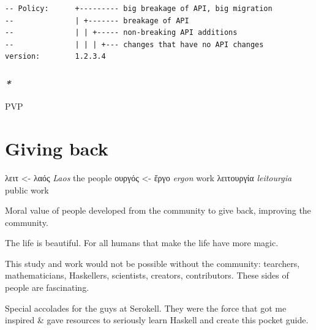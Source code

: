 \documentclass[a4paper,14pt,oneside]{book}
\begin{document}
\begin{center}

\end{center}

\begin{verbatim}
-- Policy:      +--------- big breakage of API, big migration
--              | +------- breakage of API
--              | | +----- non-breaking API additions
--              | | | +--- changes that have no API changes
version:        1.2.3.4
\end{verbatim}

\section{\emph{*}}
\label{sec:org6a955e0}

\label{org69b4ce1}PVP

\part{Giving back}
\label{sec:org02ccc74}

\textgreek{λειτ}       <- \textgreek{λαός}  \emph{Laos}       the people
    \textgreek{ουργός} <- \textgreek{ἔργο}  \emph{ergon}             work
\textgreek{λειτουργία}          \emph{leitourgia} public work

Moral value of people developed from the community to give back, improving the community.

The life is beautiful.
For all humans that make the life have more magic.

This study and work would not be possible without the community: tearchers, mathematicians, Haskellers, scientists, creators, contributors. These sides of people are fascinating.


Special accolades for the guys at Serokell. They were the force that got me inspired \& gave resources to seriously learn Haskell and create this pocket guide.
\end{document}
